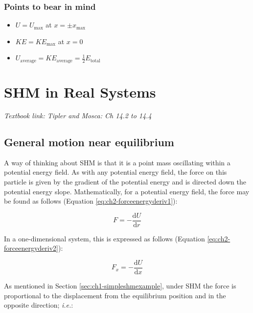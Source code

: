 \documentclass[
]{book}
\providecommand{\tightlist}{%
  \setlength{\itemsep}{0pt}\setlength{\parskip}{0pt}}
\begin{document}
\hypertarget{points-to-bear-in-mind}{%
\subsection{Points to bear in mind}\label{points-to-bear-in-mind}}

\begin{itemize}
\tightlist
\item
  \(U = U_\mathrm{max}\) at \(x = ±x_\mathrm{max}\)
\item
  \(KE = KE_\mathrm{max}\) at \(x = 0\)
\item
  \(U_\mathrm{average} = KE_\mathrm{average} = \frac{1}{2}E_\mathrm{total}\)
\end{itemize}

\hypertarget{sec:shm-real}{%
\chapter{SHM in Real Systems}\label{sec:shm-real}}

\emph{Textbook link: Tipler and Mosca: Ch 14.2 to 14.4}

\hypertarget{general-motion-near-equilibrium}{%
\section{General motion near equilibrium}\label{general-motion-near-equilibrium}}

A way of thinking about SHM is that it is a point mass oscillating within a potential energy field. As with any potential energy field, the force on this particle is given by the gradient of the potential energy and is directed down the potential energy slope. Mathematically, for a potential energy field, the force may be found as follows (Equation \eqref{eq:ch2-forceenergyderiv1}):

\begin{equation}
F = - \frac{\mathrm{d}U}{\mathrm{d}r}
\label{eq:ch2-forceenergyderiv1}
\end{equation}

In a one-dimensional system, this is expressed as follows (Equation \eqref{eq:ch2-forceenergyderiv2}):

\begin{equation}
F_x = - \frac{\mathrm{d}U}{\mathrm{d}x}
\label{eq:ch2-forceenergyderiv2}
\end{equation}

As mentioned in Section \ref{sec:ch1-simpleshmexample}, under SHM the force is proportional to the displacement from the equilibrium position and in the opposite direction; \emph{i.e.}:
\end{document}
